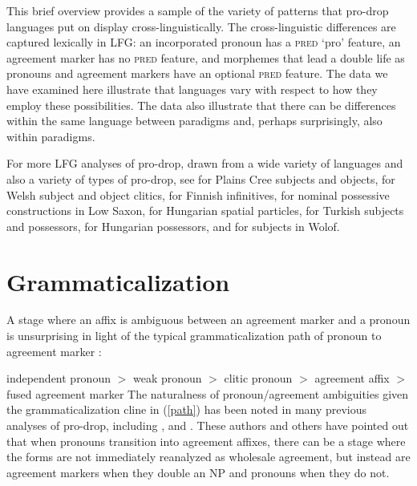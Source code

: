 \documentclass[output=paper,hidelinks]{langscibook}
\begin{document}
This brief overview  provides a   sample of the   variety of  patterns that  pro-drop languages put on display cross-linguistically.  
The cross-linguistic differences are captured lexically  in LFG: an incorporated pronoun has a \textsc{pred} `pro' feature,  an agreement marker has no \textsc{pred} feature, and morphemes that lead a double life as pronouns and  agreement markers  have an optional \textsc{pred} feature. The data we have examined here illustrate  that languages vary  with respect to how they employ these possibilities.  The data  also illustrate  that  there can be  differences within the same language between paradigms and, perhaps surprisingly, also within paradigms.  


For more    LFG analyses of pro-drop,  drawn from a wide variety of languages and also a variety of types of pro-drop, see  \citet[Chapter~5]{dahlstrom91} for Plains Cree subjects and objects, \citet{sadler97}  for Welsh subject and object clitics,   \citet{Toivonen:FinnPoss, Toivonen2001b}   for Finnish infinitives,  \citet{strunk04, Strunk05} for nominal possessive constructions in Low Saxon,   \citet{RakosiLaczko2011} for Hungarian spatial particles,  \citet{bayram13} for Turkish subjects and possessors,   \citet{Laczko17}  for Hungarian possessors, and  \citet{Dione19Clause}  for subjects in Wolof.  



\section{Grammaticalization} \label{sec:grammaticalization}


   
A   stage where an affix is ambiguous between an agreement marker and a pronoun is unsurprising in  light of the typical   grammaticalization path  of pronoun to  agreement  marker  \citep{givon1976, mithun1988, hopper_traugott_2003, vangelderen2011}:
     
 
     \ea \label{path} 
       independent pronoun $>$  weak pronoun $>$   clitic pronoun $>$    agreement affix $>$   fused agreement marker 
       \z
The naturalness of  pronoun/agreement  ambiguities    given  the grammaticalization cline in (\ref{path})   has been noted in many previous analyses of pro-drop, including  \citet{FassiFehri1984, BM87,   AustBres96, Toivonen2001b,  Morimoto:LFG2002, butt07, CoppockWechsler2010},  \citet{BarbuToivonen2018} and  .   These authors and others  have  pointed out that when   pronouns   transition into agreement affixes, there can be a stage where the forms are not immediately reanalyzed as wholesale agreement, but instead are  agreement markers when they double an NP and pronouns when they do not. 
 
\end{document}
